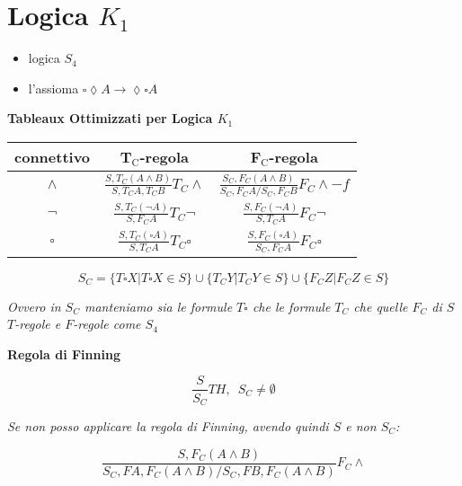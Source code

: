 \documentclass[a4paper,12pt, oneside]{book}
\begin{document}
\section*{Logica $K_1$}
\begin{itemize}
  \item logica $S_4$
  \item l'assioma $\square\lozenge A\to \lozenge\square A$
\end{itemize}
\begin{center}
  \textbf{Tableaux Ottimizzati per Logica $K_1$}
\end{center}
\begin{table}[H]
  \Large
  \centering
  \begin{tabular}{c||c|c}
    connettivo& T$_{\mbox{C}}$-regola&F$_{\mbox{C}}$-regola\\
    \hline
    \hline
    $\land$ & $\frac{S,T_C(A\land B)}{S,T_CA,T_CB}T_C\land$&
              $\frac{S_C,F_C(A\land B)}{S_C,F_CA/S_C,F_CB}F_C\land -f$\\
    \hline
    $\neg$ & $\frac{S,T_C(\neg A)}{S,F_CA}T_C\neg$&
            $\frac{S,F_C(\neg A)}{S,T_CA}F_C\neg$\\
    \hline
    $\square$ & $\frac{S,T_C(\square A)}{S,T_CA}T_C\square$ &
               $\frac{S,F_C(\square A)}{S_C,F_CA}F_C\square$
  \end{tabular}
\end{table}
\[S_C=\{T\square X|T\square X\in S\}\cup\{T_CY|T_CY\in S\}
  \cup\{F_CZ|F_CZ\in S\}\] 
\begin{center}
  \textit{Ovvero in $S_C$ manteniamo sia le formule $T\square$ che le formule
    $T_C$ che quelle $F_C$ di $S$}\\ 
  \textit{$T$-regole e $F$-regole come $S_4$}
\end{center}
\begin{center}
  \textbf{Regola di Finning}
\end{center}
\[\frac{S}{S_C}TH,\,\,\,S_C\neq \emptyset\]
\begin{center}
  \textit{Se non posso applicare la regola di Finning, avendo quindi $S$ e non
    $S_C$:} 
\end{center}
\[\frac{S,F_C(A\land B)}{S_C,FA,F_C(A\land B)/S_C,FB,F_C(A\land B)}F_C\land\]
\newpage
\end{document}
